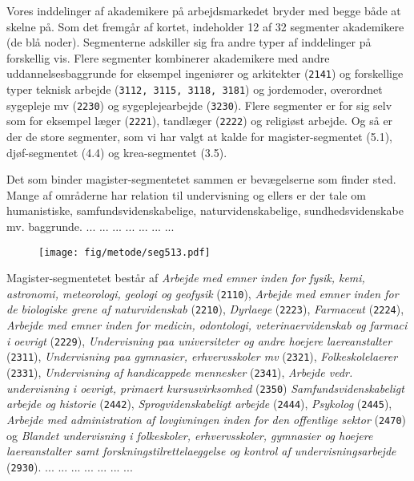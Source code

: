 Vores inddelinger af akademikere på arbejdsmarkedet bryder med begge både at skelne på. Som det fremgår af kortet, indeholder 12 af 32 segmenter akademikere (de blå noder). Segmenterne adskiller sig fra andre typer af inddelinger på forskellig vis. Flere segmenter kombinerer akademikere med andre uddannelsesbaggrunde for eksempel ingeniører og arkitekter (\texttt{2141}) og forskellige typer teknisk arbejde (\texttt{3112, 3115, 3118, 3181}) og jordemoder, overordnet sygepleje mv (\texttt{2230}) og sygeplejearbejde (\texttt{3230}). Flere segmenter er for sig selv som for eksempel læger (\texttt{2221}), tandlæger (\texttt{2222}) og religiøst arbejde. Og så er der de store segmenter, som vi har valgt at kalde for magister-segmentet (5.1), djøf-segmentet (4.4) og krea-segmentet (3.5).

Det som binder magister-segmentetet sammen er bevægelserne som finder sted. Mange af områderne har relation til undervisning og ellers er der tale om humanistiske, samfundsvidenskabelige, naturvidenskabelige, sundhedsvidenskabe mv. baggrunde. ...  ... ... ... ... ... ...
% 
\begin{figure}[H]
\begin{centering}
	\texttt{[image: fig/metode/seg513.pdf]}
	\label{fig_hovedkort_disco}
\end{centering}
\end{figure}
% 
Magister-segmentetet består af \emph{Arbejde med emner inden for fysik, kemi, astronomi, meteorologi, geologi og geofysik} (\texttt{2110}), \emph{Arbejde med emner inden for de biologiske grene af naturvidenskab} (\texttt{2210}), \emph{Dyrlaege} (\texttt{2223}), \emph{Farmaceut} (\texttt{2224}), \emph{Arbejde med emner inden for medicin, odontologi, veterinaervidenskab og farmaci i oevrigt} (\texttt{2229}), \emph{Undervisning paa universiteter og andre hoejere laereanstalter} (\texttt{2311}), \emph{Undervisning paa gymnasier, erhvervsskoler mv} (\texttt{2321}), \emph{Folkeskolelaerer} (\texttt{2331}), \emph{Undervisning af handicappede mennesker} (\texttt{2341}), \emph{Arbejde vedr. undervisning i oevrigt, primaert kursusvirksomhed} (\texttt{2350})
 \emph{Samfundsvidenskabeligt arbejde og historie} (\texttt{2442}), \emph{Sprogvidenskabeligt arbejde} (\texttt{2444}), \emph{Psykolog} (\texttt{2445}), \emph{Arbejde med administration af lovgivningen inden for den offentlige sektor} (\texttt{2470}) og \emph{Blandet undervisning i folkeskoler, erhvervsskoler, gymnasier og hoejere laereanstalter samt forskningstilrettelaeggelse og kontrol af undervisningsarbejde} (\texttt{2930}). ...  ... ... ... ... ... ...

